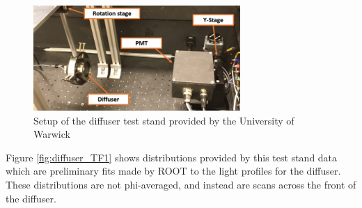 \begin{figure}
    \centering
    \includegraphics[width=0.7\textwidth]{Figures/diffuser_test_stand.png}
    \caption{Setup of the diffuser test stand provided by the University of Warwick}
    \label{fig:diffuser_test_stand}
\end{figure}

Figure \ref{fig:diffuser_TF1} shows distributions provided by this test stand data which are preliminary fits made by ROOT to the light profiles for the diffuser. These distributions are not phi-averaged, and instead are scans across the front of the diffuser.

